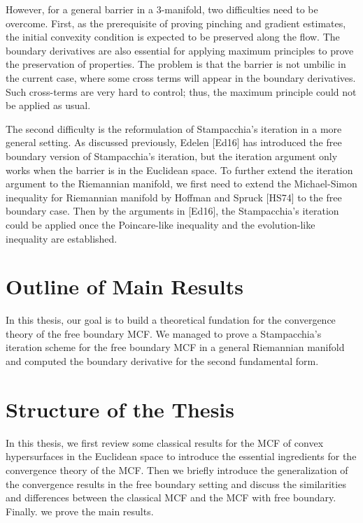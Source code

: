 However, for a general barrier in a 3-manifold, two difficulties need to be overcome. First, as the prerequisite of proving pinching and gradient estimates, the initial convexity condition is expected to be preserved along the flow. The boundary derivatives are also essential for applying maximum principles to prove the preservation of properties. The problem is that the barrier is not umbilic in the current case, where some cross terms will appear in the boundary derivatives. Such cross-terms are very hard to control; thus, the maximum principle could not be applied as usual.

The second difficulty is the reformulation of Stampacchia's iteration in a more general setting. As discussed previously, Edelen [Ed16] has introduced the free boundary version of Stampacchia's iteration, but the iteration argument only works when the barrier is in the Euclidean space. To further extend the iteration argument to the Riemannian manifold, we first need to extend the Michael-Simon inequality for Riemannian manifold by Hoffman and Spruck [HS74] to the free boundary case. Then by the arguments in [Ed16], the Stampacchia's iteration could be applied once the Poincare-like inequality and the evolution-like inequality are established.

\section{Outline of Main Results}

In this thesis, our goal is to build a theoretical fundation for the convergence theory of the free boundary MCF. We managed to prove a Stampacchia's iteration scheme for the free boundary MCF in a general Riemannian manifold and computed the boundary derivative for the second fundamental form.

\section{Structure of the Thesis}

In this thesis, we first review some classical results for the MCF of convex hypersurfaces in the Euclidean space to introduce the essential ingredients for the convergence theory of the MCF. Then we briefly introduce the generalization of the convergence results in the free boundary setting and discuss the similarities and differences between the classical MCF and the MCF with free boundary. Finally. we prove the main results. 

\chapterend